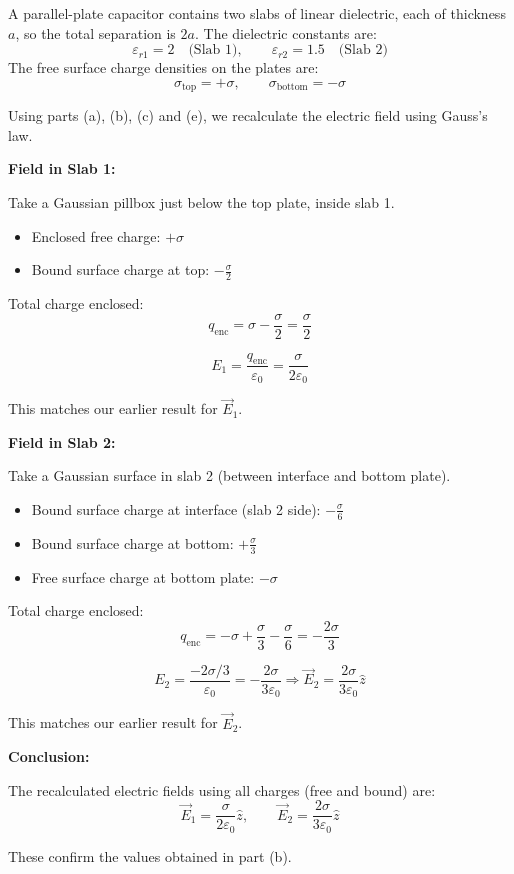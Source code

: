 \documentclass[a4paper]{article}
\begin{document}
\begin{tcolorbox}
\begin{tcolorbox}[
    title=Part (f),
    colframe=cyan!60, 
    colback=cyan!10,
    coltitle=black,
    fonttitle=\bfseries\large,
    breakable,
    enhanced,
    attach boxed title to top center={yshift=-2mm},
    boxed title style={colback=cyan!10, colframe=cyan!60}
]
A parallel-plate capacitor contains two slabs of linear dielectric, each of thickness $a$, so the total separation is $2a$. The dielectric constants are:
\[
\varepsilon_{r1} = 2 \quad \text{(Slab 1)}, \qquad \varepsilon_{r2} = 1.5 \quad \text{(Slab 2)}
\]
The free surface charge densities on the plates are:
\[
\sigma_{\text{top}} = +\sigma, \qquad \sigma_{\text{bottom}} = -\sigma
\]

Using parts (a), (b), (c) and (e), we recalculate the electric field using Gauss's law.

\textbf{Field in Slab 1:}

Take a Gaussian pillbox just below the top plate, inside slab 1.

\begin{itemize}
    \item Enclosed free charge: $+\sigma$
    \item Bound surface charge at top: $-\frac{\sigma}{2}$
\end{itemize}

Total charge enclosed:
\[
q_{\text{enc}} = \sigma - \frac{\sigma}{2} = \frac{\sigma}{2}
\]

\[
E_1 = \frac{q_{\text{enc}}}{\varepsilon_0} = \frac{\sigma}{2\varepsilon_0}
\]

This matches our earlier result for $\vec{E}_1$.

\textbf{Field in Slab 2:}

Take a Gaussian surface in slab 2 (between interface and bottom plate).

\begin{itemize}
    \item Bound surface charge at interface (slab 2 side): $-\frac{\sigma}{6}$
    \item Bound surface charge at bottom: $+\frac{\sigma}{3}$
    \item Free surface charge at bottom plate: $-\sigma$
\end{itemize}

Total charge enclosed:
\[
q_{\text{enc}} = -\sigma + \frac{\sigma}{3} - \frac{\sigma}{6} = -\frac{2\sigma}{3}
\]

\[
E_2 = \frac{-2\sigma/3}{\varepsilon_0} = -\frac{2\sigma}{3\varepsilon_0}
\Rightarrow \vec{E}_2 = \frac{2\sigma}{3\varepsilon_0} \hat{z}
\]

This matches our earlier result for $\vec{E}_2$.

\textbf{Conclusion:}

The recalculated electric fields using all charges (free and bound) are:
\[
\vec{E}_1 = \frac{\sigma}{2\varepsilon_0} \hat{z}, \qquad \vec{E}_2 = \frac{2\sigma}{3\varepsilon_0} \hat{z}
\]

These confirm the values obtained in part (b).
\end{tcolorbox}
\end{tcolorbox}
\end{document}
